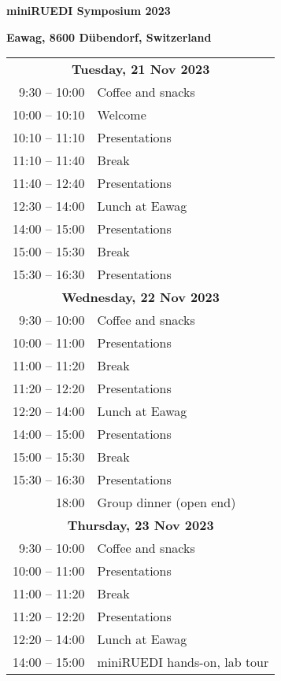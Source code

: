 \documentclass[12pt]{extbook}
\begin{document}
\thispagestyle{empty}
\begin{center}

{\LARGE \bf miniRUEDI Symposium 2023}

\bigskip
\bigskip
\bigskip

{\large \bf Eawag, 8600 Dübendorf, Switzerland}

\bigskip
\bigskip
\bigskip
\bigskip
\bigskip
\bigskip



\begin{tabular}{r@{\hskip 0.5in}l}

\multicolumn{2}{c}{\bf Tuesday, 21 Nov 2023}\\[2ex]
9:30  -- 10:00	&	Coffee and snacks\\
10:00 -- 10:10	&	Welcome\\
10:10 -- 11:10	&	Presentations\\   %
11:10 -- 11:40	&	Break\\
11:40 -- 12:40	& Presentations\\   %
12:30 -- 14:00	&	Lunch at Eawag\\
14:00 -- 15:00	&	Presentations\\   %
15:00 -- 15:30	&	Break\\
15:30 -- 16:30	&	Presentations\\[8ex]   %

\multicolumn{2}{c}{\bf Wednesday, 22 Nov 2023}\\[2ex]
9:30  -- 10:00	&	Coffee and snacks\\
10:00 -- 11:00	&	Presentations\\   %
11:00 -- 11:20	&	Break\\
11:20 -- 12:20	& Presentations\\   %
12:20 -- 14:00	&	Lunch at Eawag\\
14:00 -- 15:00	&	Presentations\\   %
15:00 -- 15:30	&	Break\\
15:30 -- 16:30	&	Presentations\\   %
18:00 \phantom{-- 00:00}	&	Group dinner (open end)\\[8ex]

\multicolumn{2}{c}{\bf Thursday, 23 Nov 2023}\\[2ex]
9:30  -- 10:00	&	Coffee and snacks\\   %
10:00 -- 11:00	&	Presentations\\
11:00 -- 11:20	&	Break\\
11:20 -- 12:20	& Presentations\\       %
12:20 -- 14:00	&	Lunch at Eawag\\
14:00 -- 15:00	&	miniRUEDI hands-on, lab tour\\[1.5ex]

\end{tabular}

\end{center}
\end{document}
